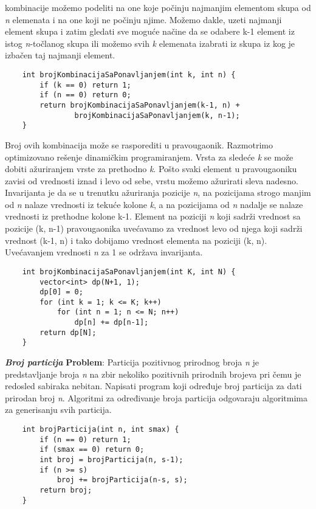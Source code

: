 \documentclass{article}
\begin{document}
kombinacije možemo podeliti na one koje počinju najmanjim elementom skupa
od \textit{n} elemenata i na one koji ne počinju njime. Možemo dakle, uzeti najmanji
element skupa i zatim gledati sve moguće načine da se odabere k-1 element iz
istog \textit{n}-točlanog skupa ili možemo svih \textit{k} elemenata izabrati iz skupa iz kog je
izbačen taj najmanji element.
\begin{lstlisting}
    int brojKombinacijaSaPonavljanjem(int k, int n) {
        if (k == 0) return 1;
        if (n == 0) return 0;
        return brojKombinacijaSaPonavljanjem(k-1, n) +
                brojKombinacijaSaPonavljanjem(k, n-1);
    }
\end{lstlisting}
Broj ovih kombinacija može se rasporediti u pravougaonik. Razmotrimo optimizovano rešenje dinamičkim programiranjem. Vrsta za sledeće
\textit{k} se može dobiti ažuriranjem vrste za prethodno \textit{k}. Pošto svaki element u
pravougaoniku zavisi od vrednosti iznad i levo od sebe, vrstu možemo ažurirati
sleva nadesno. Invarijanta je da se u trenutku ažuriranja pozicije \textit{n}, na pozicijama
strogo manjim od \textit{n} nalaze vrednosti iz tekuće kolone \textit{k}, a na pozicijama od \textit{n}
nadalje se nalaze vrednosti iz prethodne kolone k-1. Element na poziciji \textit{n} koji
sadrži vrednost sa pozicije (k, n-1) pravougaonika uvećavamo za vrednost levo
od njega koji sadrži vrednost (k-1, n) i tako dobijamo vrednost elementa na
poziciji (k, n). Uvećavanjem vrednosti \textit{n} za 1 se održava invarijanta.
\begin{lstlisting}
    int brojKombinacijaSaPonavljanjem(int K, int N) {
        vector<int> dp(N+1, 1);
        dp[0] = 0;
        for (int k = 1; k <= K; k++)
            for (int n = 1; n <= N; n++)
                dp[n] += dp[n-1];
        return dp[N];
    }
\end{lstlisting}
\vspace{0.3cm}
\textit{\textbf{Broj particija}}
\vspace{0.2cm}\newline
\textbf{Problem}: Particija pozitivnog prirodnog broja \textit{n} je predstavljanje broja \textit{n} na
zbir nekoliko pozitivnih prirodnih brojeva pri čemu je redosled sabiraka nebitan. Napisati
program koji određuje broj particija za dati prirodan broj \textit{n}.
\newline
Algoritmi za određivanje broja particija odgovaraju algoritmima za generisanju
svih particija.
\begin{lstlisting}
    int brojParticija(int n, int smax) {
        if (n == 0) return 1;
        if (smax == 0) return 0;
        int broj = brojParticija(n, s-1);
        if (n >= s)
            broj += brojParticija(n-s, s);
        return broj;
    }
\end{lstlisting}
\end{document}
